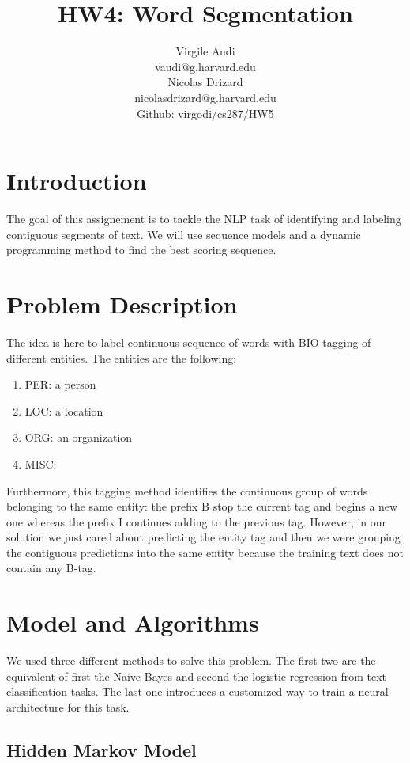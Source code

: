 \documentclass[11pt]{article}
\title{HW4: Word Segmentation}
\author{Virgile Audi \\ vaudi@g.harvard.edu \\ Nicolas Drizard \\ nicolasdrizard@g.harvard.edu \\ Github: virgodi/cs287/HW5}
\begin{document}
\maketitle{}
\section{Introduction}

The goal of this assignement is to tackle the NLP task of identifying and labeling contiguous segments of text. We will use sequence models and a dynamic programming method to find the best scoring sequence.


\section{Problem Description}

The idea is here to label continuous sequence of words with BIO tagging of different entities. The entities are the following:

\begin{enumerate}
	\item PER: a person
	\item LOC: a location
	\item ORG: an organization
	\item MISC:
\end{enumerate}

Furthermore, this tagging method identifies the continuous group of words belonging to the same entity: the prefix B stop the current tag and begins a new one whereas the prefix I continues adding to the previous tag. However, in our solution we just cared about predicting the entity tag and then we were grouping the contiguous predictions into the same entity because the training text does not contain any B-tag.


\section{Model and Algorithms}

We used three different methods to solve this problem. The first two are the equivalent of first the Naive Bayes and second the logistic regression from text classification tasks. The last one introduces a customized way to train a neural architecture for this task.

\subsection{Hidden Markov Model}
\end{document}
